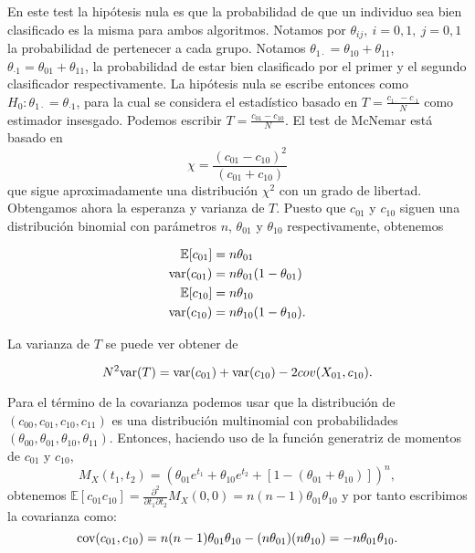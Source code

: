 	En este test la hipótesis nula es que la probabilidad de 
que un individuo sea bien clasificado es la misma para ambos 
algoritmos. Notamos por $\theta_{ij},\ i=0,1,\ j=0,1$ la 
probabilidad de pertenecer a cada grupo. Notamos 
$\theta_{1 \cdot} = \theta_{10} + \theta_{11}$, 
$\theta_{\cdot 1} = \theta_{01} + \theta_{11}$, la 
probabilidad de estar bien clasificado por el primer y el 
segundo clasificador respectivamente. La hipótesis nula se 
escribe entonces como $H_0: \theta_{1 \cdot} = 
\theta_{\cdot 1}$, para la cual se considera el estadístico 
basado en $T = \frac{c_{1 \cdot} - c_{\cdot 1}}{N}$ como 
estimador insesgado. Podemos escribir $T = \frac{c_{01} - 
c_{10}}{N}$. El test de McNemar está basado en
\begin{equation}
\label{eq:McNemarChi}
	\chi = \frac{(c_{01} - c_{10})^2}{(c_{01} + c_{10})}
\end{equation} 
	que sigue aproximadamente una distribución $\chi^2$ con 
un grado de libertad. Obtengamos ahora la esperanza y 
varianza de $T$. Puesto que $c_{01}$ y $c_{10}$ siguen una 
distribución binomial con parámetros $n$, $\theta_{01}$ y 
$\theta_{10}$ respectivamente, obtenemos

\begin{align*}
	\mathbb{E}[c_{01}] 	&= n \theta_{01} \\
	\text{var}(c_{01}) &= n \theta_{01} (1 - \theta_{01}) \\
	\mathbb{E}[c_{10}] 	&= n \theta_{10} \\
	\text{var}(c_{10}) &= n \theta_{10} (1 - \theta_{10}).
\end{align*}

	La varianza de $T$ se puede ver obtener de 
	
\begin{equation}
	N^2 \text{var}(T) = \text{var}(c_{01}) + \text{var}(c_{10}) - 2 cov(X_{01}, c_{10}).
	\label{eq:McNemarVar}
\end{equation}

	Para el término de la covarianza podemos usar que la 
distribución de $(c_{00}, c_{01}, c_{10}, c_{11})$ es una 
distribución multinomial con probabilidades $(\theta_{00}, 
\theta_{01}, \theta_{10}, \theta_{11})$. Entonces, haciendo 
uso de la función generatriz de momentos de $c_{01}$ y 
$c_{10}$,
	\[ 
		M_X(t_1, t_2) = 
		\left(
			\theta_{01} e^{t_1} + 
			\theta_{10} e^{t_2} + 
			[ 1 - (\theta_{01} + \theta_{10})] \right)^n,
	\]
obtenemos $\mathbb{E}[c_{01}c_{10}] = \frac{\partial^2 }
{\partial t_1 \partial t_2} M_X(0,0) = n(n-1)\theta_{01} 
\theta_{10}$ y por tanto escribimos la covarianza como:
	\[
		\text{cov}( c_{01}, c_{10} ) =
			n (n-1) \theta_{01} \theta_{10} -
			(n \theta_{01}) (n \theta_{10}) = 
			- n \theta_{01} \theta_{10}.
	\]
	

